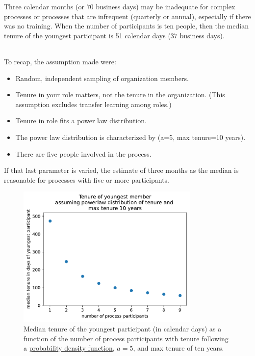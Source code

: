 Three calendar months (or 70 business days) may be inadequate for complex processes or processes that are infrequent (quarterly or annual), especially if there was no training. When the number of participants is ten people, then the median tenure of the youngest participant is 51 calendar days (37 business days).

\ \\

To recap, the assumption made were:
\begin{itemize}
    \item Random, independent sampling of organization members. 
    \item Tenure in your role matters, not the tenure in the organization. (This assumption excludes transfer learning among roles.)
    \item Tenure in role fits a power law distribution.
    \item The power law distribution is characterized by (a=5, max tenure=10 years). 
    \item There are five people involved in the process.
\end{itemize}
If that last parameter is varied, the estimate of three months as the median  is reasonable for processes with five or more participants.

\begin{figure}[!htb]  %
    \centering
    \includegraphics[width=0.8\textwidth]{images/tenure_power_distribution_a5_with_max_tenure10.pdf}
    \caption{Median tenure of the youngest participant (in calendar days) as a function of the number of process participants with tenure following a 
    \href{https://en.wikipedia.org/wiki/Probability_density_function}{probability density function},
    $a=5$, and max tenure of ten years.}
    \label{fig:tenure-powerlaw-5-participants}
\end{figure}


